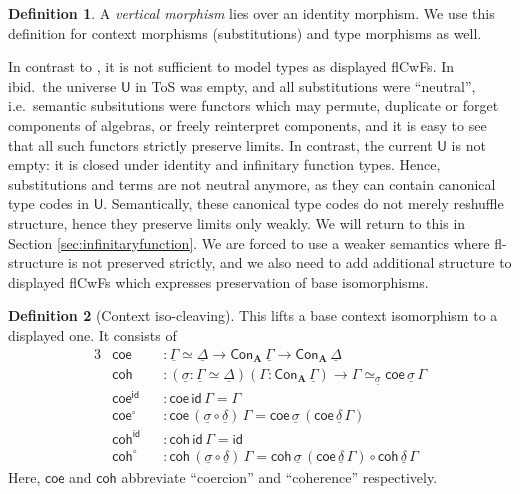 \documentclass{article}
\theoremstyle{definition}
\newtheorem{definition}{Definition}
\theoremstyle{theorem}
\newcommand{\id}{\mathsf{id}}
\newcommand{\Con}{\mathsf{Con}}
\newcommand{\U}{\mathsf{U}}
\newcommand{\ra}{\rightarrow}
\newcommand{\bA}{\boldsymbol{A}}
\newcommand{\ul}[1]{\underline{#1}}
\newcommand{\ulGamma}{\ul{\Gamma}}
\newcommand{\ulDelta}{\ul{\Delta}}
\newcommand{\uldelta}{\ul{\delta}}
\newcommand{\ulsigma}{\ul{\sigma}}
\newcommand{\coe}{\mathsf{coe}}
\newcommand{\coh}{\mathsf{coh}}
\begin{document}
\begin{definition}
A \emph{vertical morphism} lies over an identity morphism. We use this
definition for context morphisms (substitutions) and type morphisms as well.
\end{definition}

In contrast to \cite{kaposi2019constructing}, it is not sufficient to model
types as displayed flCwFs. In ibid.\ the universe $\U$ in ToS was empty, and all
substitutions were ``neutral'', i.e.\ semantic subsitutions were functors which
may permute, duplicate or forget components of algebras, or freely reinterpret
components, and it is easy to see that all such functors strictly preserve
limits. In contrast, the current $\U$ is not empty: it is closed under identity
and infinitary function types. Hence, substitutions and terms are not neutral
anymore, as they can contain canonical type codes in $\U$. Semantically, these
canonical type codes do not merely reshuffle structure, hence they preserve
limits only weakly. We will return to this in Section
\ref{sec:infinitaryfunction}. We are forced to use a weaker semantics where
fl-structure is not preserved strictly, and we also need to add additional
structure to displayed flCwFs which expresses preservation of base isomorphisms.


\begin{definition}[Context iso-cleaving] This lifts a base context isomorphism to a displayed one. It consists of
\begin{alignat*}{3}
  & \coe &&: \ulGamma \simeq \ulDelta \ra \Con_{\bA}\,\ulGamma \ra \Con_{\bA}\,\ulDelta\\
  & \coh &&: (\ulsigma : \ulGamma \simeq \ulDelta)(\Gamma : \Con_{\bA}\,\ulGamma)
           \ra \Gamma \simeq_{\ulsigma} \coe\,\ulsigma\,\Gamma\\
  & \coe^{\id} && : \coe\,\id\,\Gamma = \Gamma\\
  & \coe^{\circ} && : \coe\,(\ulsigma\circ\uldelta)\,\Gamma = \coe\,\ulsigma\,(\coe\,\uldelta\,\Gamma)\\
  & \coh^{\id} && : \coh\,\id\,\Gamma = \id\\
  & \coh^{\circ} && : \coh\,(\ulsigma\circ\uldelta)\,\Gamma = \coh\,\ulsigma\,(\coe\,\uldelta\,\Gamma)
          \circ \coh\,\uldelta\,\Gamma
\end{alignat*}
Here, $\coe$ and $\coh$ abbreviate ``coercion'' and ``coherence'' respectively.
\end{definition}
\end{document}
